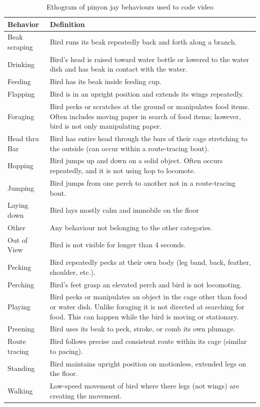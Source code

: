 \documentclass[
  pub]{apa6}
\begin{document}
\begin{table}

\caption{\label{tab:ethogram-tbl}Ethogram of pinyon jay behaviours used to code video}
\centering
\fontsize{10}{12}\selectfont
\begin{tabular}[t]{>{\raggedright\arraybackslash}p{1in}>{\raggedright\arraybackslash}p{5in}}
\toprule
Behavior & Definition\\
\midrule
Beak scraping & Bird runs its beak repeatedly back and forth along a branch.\\
Drinking & Bird's head is raised toward water bottle or lowered to the water dish and has beak in contact with the water.\\
Feeding & Bird has its beak inside feeding cup.\\
Flapping & Bird is in an upright position and extends its wings repeatedly.\\
Foraging & Bird pecks or scratches at the ground or manipulates food items. Often includes moving paper in search of food items; however, bird is not only manipulating paper.\\
Head thru Bar & Bird has entire head through the bars of their cage stretching to the outside (can occur within a route-tracing bout).\\
Hopping & Bird jumps up and down on a solid object. Often occurs repeatedly, and it is not using hop to locomote.\\
Jumping & Bird jumps from one perch to another not in a route-tracing bout.\\
Laying down & Bird lays mostly calm and immobile on the floor\\
Other & Any behaviour not belonging to the other categories.\\
Out of View & Bird is not visible for longer than 4 seconds.\\
Pecking & Bird repeatedly pecks at their own body (leg band, back, feather, shoulder, etc.).\\
Perching & Bird's feet grasp an elevated perch and bird is not locomoting.\\
Playing & Bird pecks or manipulates an object in the cage other than food or water dish. Unlike foraging it is not directed at searching for food. This can happen while the bird is moving or stationary.\\
Preening & Bird uses its beak to peck, stroke, or comb its own plumage.\\
Route tracing & Bird follows precise and consistent route within its cage (similar to pacing).\\
Standing & Bird maintains upright position on motionless, extended legs on the floor.\\
Walking & Low-speed movement of bird where there legs (not wings) are creating the movement.\\
\bottomrule
\end{tabular}
\end{table}
\end{document}
